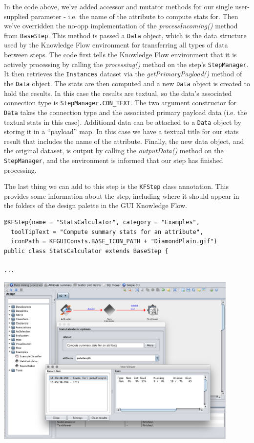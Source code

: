 In the code above, we've added accessor and mutator methods for our
single user-supplied parameter - i.e. the name of the attribute to
compute stats for. Then we've overridden the no-opp implementation of
the \textit{processIncoming()} method from \verb=BaseStep=. This
method is passed a \verb=Data= object, which is the data structure
used by the Knowledge Flow environment for transferring all types of
data between steps. The code first tells the Knowledge Flow
environment that it is actively processing by calling the
\textit{processing()} method on the step's \verb=StepManager=. It then
retrieves the \verb=Instances= dataset via the
\textit{getPrimaryPayload()} method of the \verb=Data= object. The
stats are then computed and a new \verb=Data= object is created to
hold the results. In this case the results are textual, so the data's
associated connection type is \verb=StepManager.CON_TEXT=. The two
argument constructor for \verb=Data= takes the connection type and the
associated primary payload data (i.e. the textual stats in this
case). Additional data can be attached to a \verb=Data= object by
storing it in a ``payload'' map. In this case we have a textual title
for our stats result that includes the name of the attribute. Finally,
the new data object, and the original dataset, is output by calling
the \textit{outputData()} method on the \verb=StepManager=, and the
environment is informed that our step has finished processing.

The last thing we can add to this step is the \verb=KFStep= class
annotation. This provides some information about the step, including
where it should appear in the folders of the design palette in the
GUI Knowledge Flow.

\begin{verbatim}
@KFStep(name = "StatsCalculator", category = "Examples",
  toolTipText = "Compute summary stats for an attribute",
  iconPath = KFGUIConsts.BASE_ICON_PATH + "DiamondPlain.gif")
public class StatsCalculator extends BaseStep {

...
\end{verbatim}


\begin{center}
  \includegraphics[width=12cm]{images/knowledgeflow/statsCalc.eps}
\end{center}

